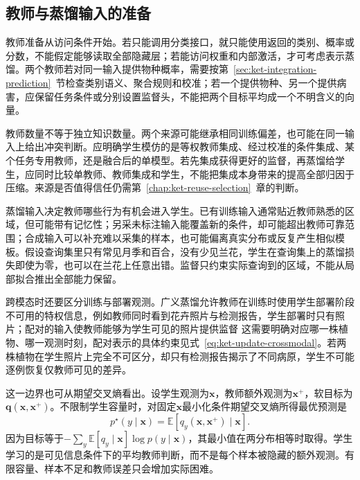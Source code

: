 \subsection{教师与蒸馏输入的准备}
\label{sec:ket-integration-teachers-inputs}

教师准备从访问条件开始。若只能调用分类接口，就只能使用返回的类别、概率或分数，不能假定能够读取全部隐藏层；若能访问权重和内部激活，才可考虑表示蒸馏。两个教师若对同一输入提供物种概率，需要按第~\ref{sec:ket-integration-prediction}~节检查类别语义、聚合规则和校准；若一个提供物种、另一个提供病害，应保留任务条件或分别设置监督头，不能把两个目标平均成一个不明含义的向量。

教师数量不等于独立知识数量。两个来源可能继承相同训练偏差，也可能在同一输入上给出冲突判断。应明确学生模仿的是等权教师集成、经过校准的条件集成、某个任务专用教师，还是融合后的单模型。若先集成获得更好的监督，再蒸馏给学生，应同时比较单教师、教师集成和学生，不能把集成本身带来的提高全部归因于压缩。来源是否值得信任仍需第~\ref{chap:ket-reuse-selection}~章的判断。

蒸馏输入决定教师哪些行为有机会进入学生。已有训练输入通常贴近教师熟悉的区域，但可能带有记忆性；另采未标注输入能覆盖新的条件，却可能超出教师可靠范围；合成输入可以补充难以采集的样本，也可能偏离真实分布或反复产生相似模板。假设查询集里只有常见月季和百合，没有少见兰花，学生在查询集上的蒸馏损失即使为零，也可以在兰花上任意出错。监督只约束实际查询到的区域，不能从局部拟合推出全部能力保留。

跨模态时还要区分训练与部署观测。广义蒸馏允许教师在训练时使用学生部署阶段不可用的特权信息，例如教师同时看到花卉照片与检测报告，学生部署时只有照片；配对的输入使教师能够为学生可见的照片提供监督
这需要明确对应哪一株植物、哪一观测时刻，配对表示的具体约束见式~\eqref{eq:ket-update-crossmodal}。若两株植物在学生照片上完全不可区分，却只有检测报告揭示了不同病原，学生不可能逐例恢复仅教师可见的差异。

这一边界也可从期望交叉熵看出。设学生观测为$\bm{x}$，教师额外观测为$\bm{x}^{+}$，软目标为$\bm{q}(\bm{x},\bm{x}^{+})$。不限制学生容量时，对固定$\bm{x}$最小化条件期望交叉熵所得最优预测是
\begin{equation}
  p^\star(y\mid\bm{x})
   =\mathbb{E}\!\left[q_y(\bm{x},\bm{x}^{+})\mid\bm{x}\right].
  \label{eq:ket-integration-privileged-limit}
\end{equation}
因为目标等于$-\sum_y\mathbb{E}[q_y\mid\bm{x}]\log p(y\mid\bm{x})$，其最小值在两分布相等时取得。学生学习的是可见信息条件下的平均教师判断，而不是每个样本被隐藏的额外观测。有限容量、样本不足和教师误差只会增加实际困难。

